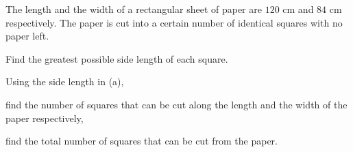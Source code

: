  The length and the width of a rectangular sheet of paper are $120$ cm and $84$ cm respectively. The paper is cut into a certain number of identical squares with no paper left.

\begin{subparts}
  \item Find the greatest possible side length of each square.
  \item Using the side length in (a),
  \begin{subpartsii}
    \item find the number of squares that can be cut along the length and the width of the paper respectively,
    \item find the total number of squares that can be cut from the paper.
  \end{subpartsii}
\end{subparts}

